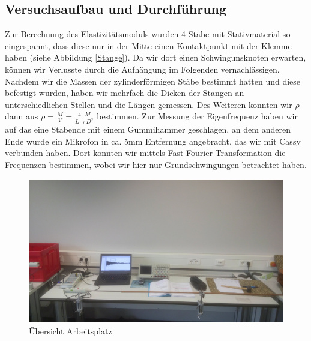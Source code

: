 \documentclass[12pt,a4paper]{article}
\begin{document}
\subsection{Versuchsaufbau und Durchführung}
Zur Berechnung des Elastizitätsmoduls wurden 4 Stäbe mit Stativmaterial so eingespannt, dass diese nur in der Mitte einen Kontaktpunkt mit der Klemme haben (siehe Abbildung \ref{Stange}). Da wir dort einen Schwingunsknoten erwarten, können wir Verlusste durch die Aufhängung im Folgenden vernachlässigen. Nachdem wir die Massen der zylinderförmigen Stäbe bestimmt hatten und diese befestigt wurden, haben wir mehrfach die Dicken der Stangen an unterschiedlichen Stellen und die Längen gemessen. Des Weiteren konnten wir $\rho$ dann aus $\rho=\frac{M}{V}=\frac{4\cdot M}{L\cdot \pi D^2}$ bestimmen.\newline
Zur Messung der Eigenfrequenz haben wir auf das eine Stabende mit einem Gummihammer geschlagen, an dem anderen Ende wurde ein Mikrofon in ca. 5mm Entfernung angebracht, das wir mit Cassy verbunden haben. Dort konnten wir mittels Fast-Fourier-Transformation die Frequenzen bestimmen, wobei wir hier nur Grundschwingungen betrachtet haben.
\begin{figure}[H]
\centering
\includegraphics[scale=0.093]{Bilder/Arbeitsplatz_Stange.jpg}
\caption{Übersicht Arbeitsplatz}
\end{figure}
\end{document}
